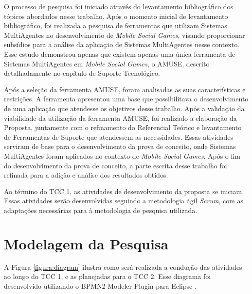 O processo de pesquisa foi iniciado através do levantamento bibliográfico dos tópicos abordados nesse trabalho. Após o momento inicial de levantamento bibliográfico, foi realizada a pesquisa de ferramentas que utilizam Sistemas MultiAgentes no desenvolvimento de \textit{Mobile Social Games}, visando proporcionar subsídios para a análise da aplicação de Sistemas MultiAgentes nesse contexto. Esse estudo demonstrou apenas que existem apenas uma única ferramenta de Sistemas MultiAgentes em \textit{Mobile Social Games}, o AMUSE, descrito detalhadamente no capítulo de Suporte Tecnológico.

Após a seleção da ferramenta AMUSE, foram analisadas as suas características e restrições. A ferramenta apresentou uma base que possibilitava o desenvolvimento de uma aplicação que atendesse os objetivos desse trabalho. Após a validação da viabilidade da utilização da ferramenta AMUSE, foi realizado a elaboração da Proposta, juntamente com o refinamento do Referencial Teórico e levantamento de Ferramentas de Suporte que atendessem as necessidades. Essas atividades serviram de base para o desenvolvimento da prova de conceito, onde Sistemas MultiAgentes foram aplicados no contexto de \textit{Mobile Social Games}. Após o fim do desenvolvimento da prova de conceito, a parte escrita desse trabalho foi refinada para a adição e análise dos resultados obtidos.

Ao término do TCC 1, as atividades de desenvolvimento da proposta se iniciam. Essas atividades serão desenvolvidas seguindo a metodologia ágil \textit{Scrum}, com as adaptações necessárias para à metodologia de pesquisa utilizada.

\section{Modelagem da Pesquisa}

A Figura \ref{figura:diagram} ilustra como será realizada a condução das atividades ao longo do TCC 1, e as planejadas para o TCC 2. Esse diagrama foi desenvolvido utilizando o BPMN2 Modeler Plugin para Eclipse \cite{eclipse}.


